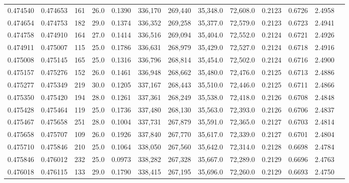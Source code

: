 \begin{tabular}{rrrrrrrrrrrrr}
0.474540 & 0.474653 &   161 & 26.0 &                                     0.1390 & 336,170 & 269,440 &  35,348.0 &  72,608.0 & 0.2123 & 0.6726 & 2.4958 \\
0.474654 & 0.474753 &   182 & 29.0 &                                     0.1374 & 336,352 & 269,258 &  35,377.0 &  72,579.0 & 0.2123 & 0.6723 & 2.4941 \\
0.474758 & 0.474910 &   164 & 27.0 &                                     0.1414 & 336,516 & 269,094 &  35,404.0 &  72,552.0 & 0.2124 & 0.6721 & 2.4926 \\
0.474911 & 0.475007 &   115 & 25.0 &                                     0.1786 & 336,631 & 268,979 &  35,429.0 &  72,527.0 & 0.2124 & 0.6718 & 2.4916 \\
0.475008 & 0.475145 &   165 & 25.0 &                                     0.1316 & 336,796 & 268,814 &  35,454.0 &  72,502.0 & 0.2124 & 0.6716 & 2.4900 \\
0.475157 & 0.475276 &   152 & 26.0 &                                     0.1461 & 336,948 & 268,662 &  35,480.0 &  72,476.0 & 0.2125 & 0.6713 & 2.4886 \\
0.475277 & 0.475349 &   219 & 30.0 &                                     0.1205 & 337,167 & 268,443 &  35,510.0 &  72,446.0 & 0.2125 & 0.6711 & 2.4866 \\
0.475350 & 0.475420 &   194 & 28.0 &                                     0.1261 & 337,361 & 268,249 &  35,538.0 &  72,418.0 & 0.2126 & 0.6708 & 2.4848 \\
0.475428 & 0.475464 &   119 & 25.0 &                                     0.1736 & 337,480 & 268,130 &  35,563.0 &  72,393.0 & 0.2126 & 0.6706 & 2.4837 \\
0.475467 & 0.475658 &   251 & 28.0 &                                     0.1004 & 337,731 & 267,879 &  35,591.0 &  72,365.0 & 0.2127 & 0.6703 & 2.4814 \\
0.475658 & 0.475707 &   109 & 26.0 &                                     0.1926 & 337,840 & 267,770 &  35,617.0 &  72,339.0 & 0.2127 & 0.6701 & 2.4804 \\
0.475710 & 0.475846 &   210 & 25.0 &                                     0.1064 & 338,050 & 267,560 &  35,642.0 &  72,314.0 & 0.2128 & 0.6698 & 2.4784 \\
0.475846 & 0.476012 &   232 & 25.0 &                                     0.0973 & 338,282 & 267,328 &  35,667.0 &  72,289.0 & 0.2129 & 0.6696 & 2.4763 \\
0.476018 & 0.476115 &   133 & 29.0 &                                     0.1790 & 338,415 & 267,195 &  35,696.0 &  72,260.0 & 0.2129 & 0.6693 & 2.4750 \\

\end{tabular}

